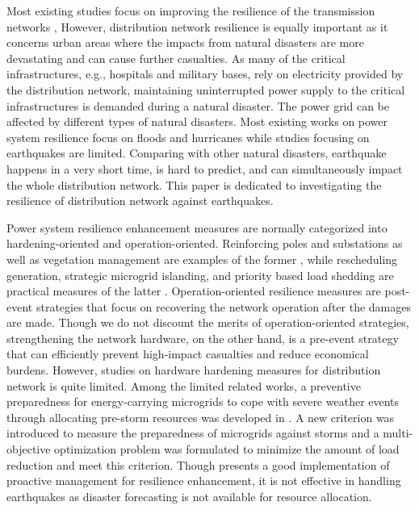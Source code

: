 \documentclass[conference]{IEEEtran}
\begin{document}
Most existing studies focus on improving the resilience of the transmission networks \cite{Aziz_transmissionResilience_2021}, However, distribution network resilience is equally important as it concerns urban areas where the impacts from natural disasters are more devastating and can cause further casualties. As many of the critical infrastructures, e.g., hospitals and military bases, rely on electricity provided by the distribution network, maintaining uninterrupted power supply to the critical infrastructures is demanded during a natural disaster. The power grid can be affected by different types of natural disasters. Most existing works on power system resilience focus on floods \cite{Costa_flood_2017} and hurricanes \cite{Shen_hurricane_2021} while studies focusing on earthquakes are limited. Comparing with other natural disasters, earthquake happens in a very short time, is hard to predict, and can simultaneously impact the whole distribution network. This paper is dedicated to investigating the resilience of distribution network against earthquakes.

Power system resilience enhancement measures are normally categorized into hardening-oriented and operation-oriented. Reinforcing poles and substations as well as vegetation management are examples of the former \cite{panteli_2017}, while rescheduling generation, strategic microgrid islanding, and priority based load shedding are practical measures of the latter \cite{ESPINOZA_2016}. Operation-oriented resilience measures are post-event strategies that focus on recovering the network operation after the damages are made. Though we do not discount the merits of operation-oriented strategies, strengthening the network hardware, on the other hand, is a pre-event strategy that can efficiently prevent high-impact casualties and reduce economical burdens. However, studies on hardware hardening measures for distribution network is quite limited. Among the limited related works, a preventive preparedness for energy-carrying microgrids to cope with severe weather events through allocating pre-storm resources was developed in \cite{amirioun_2019}. A new criterion was introduced to measure the preparedness of microgrids against storms and a multi-objective optimization problem was formulated to minimize the amount of load reduction and meet this criterion.  Though \cite{amirioun_2019} presents a good implementation of proactive management for resilience enhancement, it is not effective in handling earthquakes as disaster forecasting is not available for resource allocation.
\end{document}
